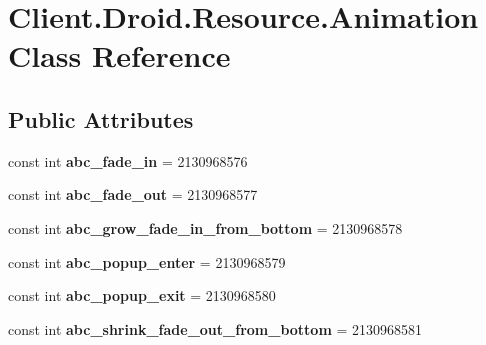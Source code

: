 \hypertarget{classClient_1_1Droid_1_1Resource_1_1Animation}{}\section{Client.\+Droid.\+Resource.\+Animation Class Reference}
\label{classClient_1_1Droid_1_1Resource_1_1Animation}
\subsection*{Public Attributes}
\begin{DoxyCompactItemize}
\item 
\hypertarget{classClient_1_1Droid_1_1Resource_1_1Animation_a15f6cc39f92a84e926b18debdf02cc37}{}const int {\bfseries abc\+\_\+fade\+\_\+in} = 2130968576\label{classClient_1_1Droid_1_1Resource_1_1Animation_a15f6cc39f92a84e926b18debdf02cc37}

\item 
\hypertarget{classClient_1_1Droid_1_1Resource_1_1Animation_a8ffc820dbcb14f4b15b3dad7d06946b6}{}const int {\bfseries abc\+\_\+fade\+\_\+out} = 2130968577\label{classClient_1_1Droid_1_1Resource_1_1Animation_a8ffc820dbcb14f4b15b3dad7d06946b6}

\item 
\hypertarget{classClient_1_1Droid_1_1Resource_1_1Animation_a668394a7aabe599836cede64da0a5064}{}const int {\bfseries abc\+\_\+grow\+\_\+fade\+\_\+in\+\_\+from\+\_\+bottom} = 2130968578\label{classClient_1_1Droid_1_1Resource_1_1Animation_a668394a7aabe599836cede64da0a5064}

\item 
\hypertarget{classClient_1_1Droid_1_1Resource_1_1Animation_a6bd423d7368f93d339239ee59647129b}{}const int {\bfseries abc\+\_\+popup\+\_\+enter} = 2130968579\label{classClient_1_1Droid_1_1Resource_1_1Animation_a6bd423d7368f93d339239ee59647129b}

\item 
\hypertarget{classClient_1_1Droid_1_1Resource_1_1Animation_a249c12d5da96e610876c91cbc3d0e321}{}const int {\bfseries abc\+\_\+popup\+\_\+exit} = 2130968580\label{classClient_1_1Droid_1_1Resource_1_1Animation_a249c12d5da96e610876c91cbc3d0e321}

\item 
\hypertarget{classClient_1_1Droid_1_1Resource_1_1Animation_ab9bb28907ba1806c1f250009badf5422}{}const int {\bfseries abc\+\_\+shrink\+\_\+fade\+\_\+out\+\_\+from\+\_\+bottom} = 2130968581\label{classClient_1_1Droid_1_1Resource_1_1Animation_ab9bb28907ba1806c1f250009badf5422}


\end{DoxyCompactItemize}
